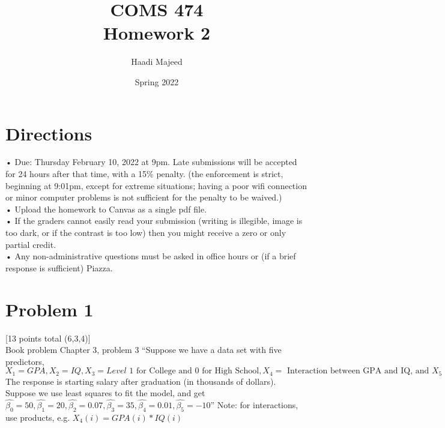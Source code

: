 \documentclass[12pt]{article}
\title{ COMS 474\\Homework 2 }
\author{ Haadi Majeed }
\date{Spring 2022}
\begin{document}
\maketitle
\pagebreak

\tableofcontents
\pagebreak
\section{Directions}
• Due: Thursday February 10, 2022 at 9pm. Late submissions will be accepted for
24 hours after that time, with a 15\% penalty. (the enforcement is strict, beginning at
9:01pm, except for extreme situations; having a poor wifi connection or minor computer
problems is not sufficient for the penalty to be waived.)
\\• Upload the homework to Canvas as a single pdf file.
\\• If the graders cannot easily read your submission (writing is illegible, image is too dark,
or if the contrast is too low) then you might receive a zero or only partial credit.
\\• Any non-administrative questions must be asked in office hours or (if a brief response
is sufficient) Piazza.

\pagebreak
\section{Problem 1}
 [13 points total (6,3,4)]\\

Book problem Chapter 3, problem 3 “Suppose we have a data set with five predictors, $X_1 = GPA, X_2 = IQ, X_3 = Level \text{ 1 for College and 0 for High School}, X_4 = \text{ Interaction between GPA and IQ, and } X_5 = \text{Interaction between GPA and Level.}$  The response is starting salary after graduation (in thousands of dollars).  Suppose we use least squares to fit the model, and get $ \hat{\beta_0} = 50, \hat{\beta_1} = 20, \hat{\beta_2} = 0.07, \hat{\beta_3} = 35, \hat{\beta_4} = 0.01, \hat{\beta_5} = -10$” \newline
Note: for interactions, use products, e.g. $X_4(i) = GPA(i) * IQ(i)$
\end{document}
